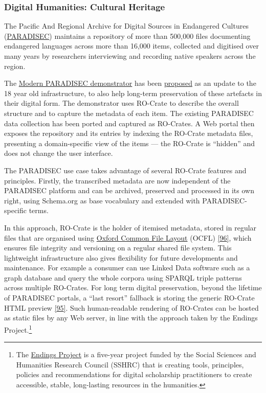 {\hypertarget{culturalheritage}{%
\subsubsection{Digital Humanities: Cultural
Heritage}\label{culturalheritage}}

The Pacific And Regional Archive for Digital Sources in Endangered
Cultures (\href{https://www.paradisec.org.au/}{PARADISEC})
\cite{ch5-114} maintains a
repository of more than 500,000 files documenting endangered languages
across more than 16,000 items, collected and digitised over many years
by researchers interviewing and recording native speakers across the
region.

The \href{https://mod.paradisec.org.au/}{Modern PARADISEC demonstrator}
has been
\href{https://arkisto-platform.github.io/case-studies/paradisec/}{proposed}
as an update to the 18 year old infrastructure, to also help long-term
preservation of these artefacts in their digital form. The demonstrator
uses RO-Crate to describe the overall structure and to capture the
metadata of each item. The existing PARADISEC data collection has been
ported and captured as RO-Crates. A Web portal then exposes the
repository and its entries by indexing the RO-Crate metadata files,
presenting a domain-specific view of the items --- the RO-Crate is
``hidden'' and does not change the user interface.

The PARADISEC use case takes advantage of several RO-Crate features and
principles. Firstly, the transcribed metadata are now independent of the
PARADISEC platform and can be archived, preserved and processed in its
own right, using Schema.org as base vocabulary and extended with
PARADISEC-specific terms.

In this approach, RO-Crate is the holder of itemised metadata, stored in
regular files that are organised using
\href{https://ocfl.io/1.0/spec/}{Oxford Common File Layout} (OCFL)
\href{https://ocfl.io/1.0/spec/}{{[}96{]}}, which ensures file integrity
and versioning on a regular shared file system. This lightweight
infrastructure also gives flexibility for future developments and
maintenance. For example a consumer can use Linked Data software such as
a graph database and query the whole corpora using SPARQL triple
patterns across multiple RO-Crates. For long term digital preservation,
beyond the lifetime of PARADISEC portals, a ``last resort'' fallback is
storing the generic RO-Crate HTML preview
\href{https://www.npmjs.com/package/ro-crate-html-js}{{[}95{]}}. Such
human-readable rendering of RO-Crates can be hosted as static files by
any Web server, in line with the approach taken by the Endings
Project.\footnote{The \href{https://endings.uvic.ca/}{Endings Project}
  is a five-year project funded by the Social Sciences and Humanities
  Research Council (SSHRC) that is creating tools, principles, policies
  and recommendations for digital scholarship practitioners to create
  accessible, stable, long-lasting resources in the humanities.}

}
